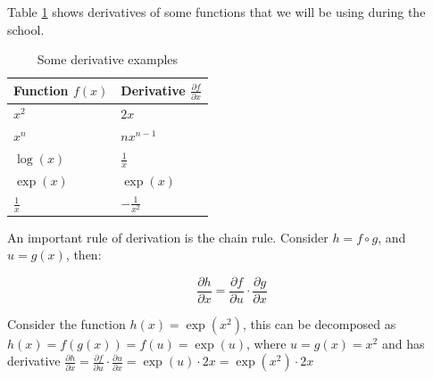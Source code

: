\noindent Table \ref{tb::derivatives} shows derivatives of some functions that we will be using during the school.

\begin{table}[!h]
\begin{center}
\begin{tabular}{|l|l|}
\hline
Function $f(x)$& Derivative $\frac{\partial f}{\partial x}$\\
\hline
$x^2$ & $2x$\\
\hline
$x^n$ & $nx^{n-1}$\\
\hline
$\log(x)$ & $\frac{1}{x}$\\
\hline
$\exp(x)$ & $\exp(x)$\\
\hline
$\frac{1}{x}$ & $-\frac{1}{x^{2}}$\\
\hline
\end{tabular}
\end{center}
\caption{\label{tb::derivatives}Some derivative examples}
\end{table}

An important rule of derivation is the chain rule. Consider $h=f\circ g$, and $u=g(x)$, then:

\begin{equation}
\frac{\partial h}{\partial x}=\frac{\partial f}{\partial u}\cdot\frac{\partial g}{\partial x}
\end{equation}

\begin{example}

Consider the function $h(x)=\exp(x^{2})$, this can be decomposed as $h(x)=f(g(x))=f(u)=\exp(u)$, where $u=g(x)=x^{2}$ and has derivative $\frac{\partial h}{\partial x}=\frac{\partial f}{\partial u}\cdot \frac{\partial u}{\partial x}=\exp(u) \cdot 2x=\exp(x^{2}) \cdot 2x$

\end{example}

